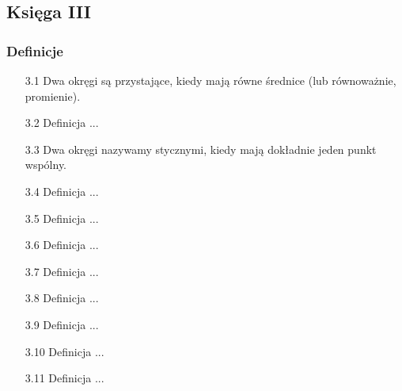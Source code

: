 %

\subsection{Księga III}
\subsubsection{Definicje}
\begin{enumerate}
    \item [3.1] Dwa okręgi są przystające, kiedy mają równe średnice (lub równoważnie, promienie).
    \item [3.2] Definicja ...
    \item [3.3] Dwa okręgi nazywamy stycznymi, kiedy mają dokładnie jeden punkt wspólny.
    \item [3.4] Definicja ...
    \item [3.5] Definicja ...
    \item [3.6] Definicja ...
    \item [3.7] Definicja ...
    \item [3.8] Definicja ...
    \item [3.9] Definicja ...
    \item [3.10] Definicja ...
    \item [3.11] Definicja ...
\end{enumerate}

